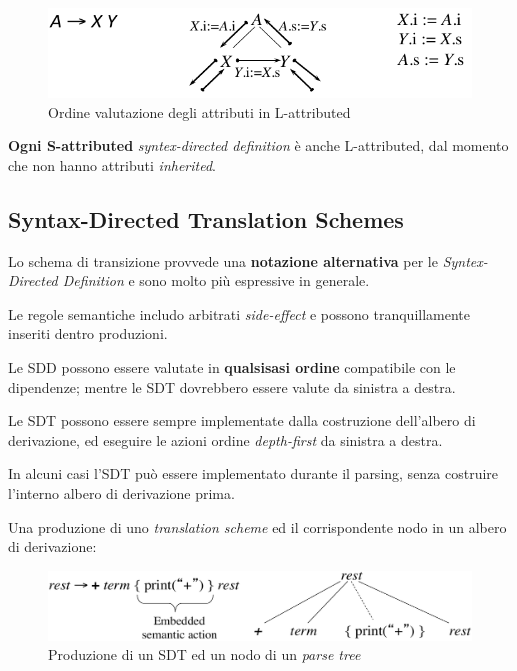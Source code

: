 \begin{figure}[H]
  \centering
  \includegraphics[scale=0.6]{res/image/order_in_Lattributed}
  \caption{Ordine valutazione degli attributi in L-attributed}
  \label{img:order_in_Lattributed}
\end{figure}

\textbf{Ogni S-attributed} \textit{syntex-directed definition} \`e anche
L-attributed, dal momento che non hanno attributi \textit{inherited}.

\subsection{Syntax-Directed Translation Schemes}
Lo schema di transizione provvede una \textbf{notazione alternativa} per le
\textit{Syntex-Directed Definition} e sono molto pi\`u espressive in generale.

Le regole semantiche includo arbitrati \textit{side-effect} e possono
tranquillamente inseriti dentro produzioni.

Le SDD possono essere valutate in \textbf{qualsisasi ordine} compatibile con le
dipendenze; mentre le SDT dovrebbero essere valute da sinistra a destra.

Le SDT possono essere sempre implementate dalla costruzione dell'albero di
derivazione, ed eseguire le azioni ordine \textit{depth-first} da sinistra a
destra.

In alcuni casi l'SDT pu\`o essere implementato durante il parsing, senza
costruire l'interno albero di derivazione prima.

Una produzione di uno \textit{translation scheme} ed il corrispondente nodo in
un albero di derivazione:
\begin{figure}[H]
  \includegraphics[scale=0.45]{res/image/production_node}
  \caption{Produzione di un SDT ed un nodo di un \textit{parse tree}}
  \label{img:production_node}
\end{figure}

